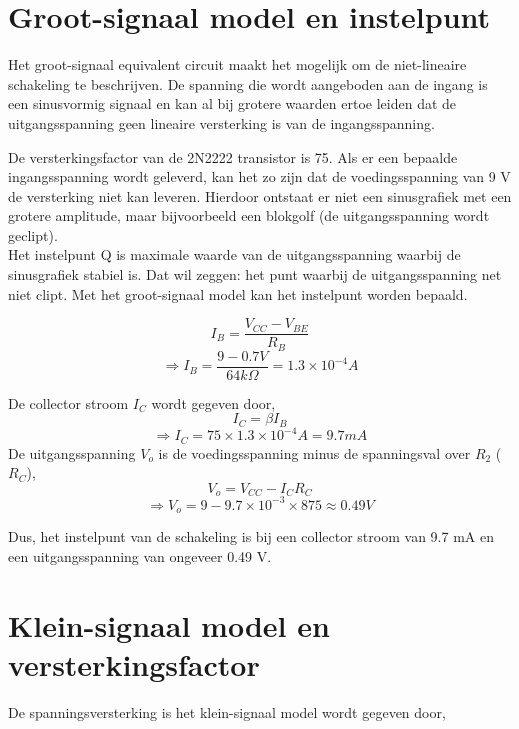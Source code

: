 \documentclass[11pt]{article}
\begin{document}
\section{Groot-signaal model en instelpunt}

Het groot-signaal equivalent circuit maakt het mogelijk om de niet-lineaire schakeling te beschrijven. De spanning die wordt aangeboden aan de ingang is een sinusvormig signaal en kan al bij grotere waarden ertoe leiden dat de uitgangsspanning geen lineaire versterking is van de ingangsspanning.

De versterkingsfactor van de 2N2222 transistor is 75. Als er een bepaalde ingangsspanning wordt geleverd, kan het zo zijn dat de voedingsspanning van 9 V de versterking niet kan leveren. Hierdoor ontstaat er niet een sinusgrafiek met een grotere amplitude, maar bijvoorbeeld een blokgolf (de uitgangsspanning wordt geclipt).\\

Het instelpunt Q is maximale waarde van de uitgangsspanning waarbij de sinusgrafiek stabiel is. Dat wil zeggen: het punt waarbij de uitgangsspanning net niet clipt. Met het groot-signaal model kan het instelpunt worden bepaald.

\begin{equation}
I_B=\frac{V_{CC}-V_{BE}}{R_B}
\end{equation}
$$\Rightarrow I_B=\frac{9-0.7 V}{64k \Omega}=1.3\times 10^{-4}A$$

De collector stroom $I_C$ wordt gegeven door, 
\begin{equation}
I_C=\beta I_B
\end{equation}
$$\Rightarrow I_C=75 \times 1.3\times 10^{-4}A=9.7 mA$$
De uitgangsspanning $V_o$ is de voedingsspanning minus de spanningsval over $R_2$ ($R_C$),
\begin{equation}
V_o=V_{CC}-I_{C}R_{C}
\end{equation}
$$\Rightarrow V_o=9-9.7\times 10^{-3}\times 875\approx 0.49 V$$

\noindent Dus, het instelpunt van de schakeling is bij een collector stroom van 9.7 mA en een uitgangsspanning van ongeveer 0.49 V.

\newpage
\section{Klein-signaal model en versterkingsfactor}

De spanningsversterking is het klein-signaal model wordt gegeven door,
\end{document}
